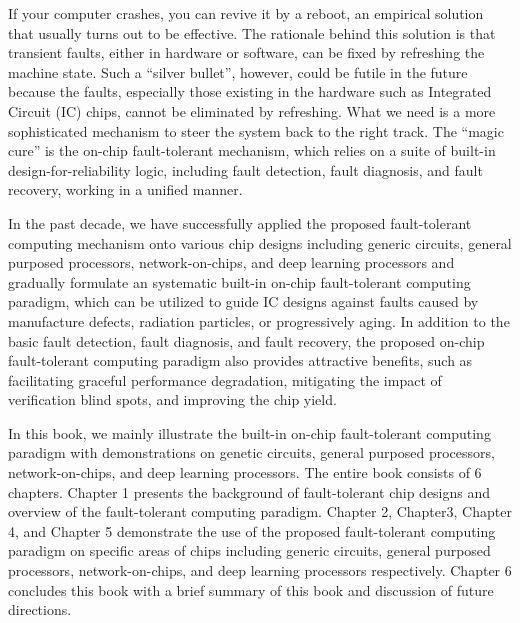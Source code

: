 %
%

\preface

If your computer crashes, you can revive it by a reboot, an empirical solution that usually turns out to be effective. The rationale behind this solution is that transient faults, either in hardware or software, can be fixed by refreshing the machine state. Such a “silver bullet”, however, could be futile in the future because the faults, especially those existing in the hardware such as Integrated Circuit (IC) chips, cannot be eliminated by refreshing. What we need is a more sophisticated mechanism to steer the system back to the right track. The “magic cure” is the on-chip fault-tolerant mechanism, which relies on a suite of built-in design-for-reliability logic, including fault detection, fault diagnosis, and fault recovery, working in a unified manner. 

In the past decade, we have successfully applied the proposed fault-tolerant computing mechanism onto various chip designs including generic circuits, general purposed processors, network-on-chips, and deep learning processors and gradually formulate an systematic built-in on-chip fault-tolerant computing paradigm, which can be utilized to guide IC designs against faults caused by manufacture defects, radiation particles, or progressively aging. In addition to the basic fault detection, fault diagnosis, and fault recovery, the proposed on-chip fault-tolerant computing paradigm also provides attractive benefits, such as facilitating graceful performance degradation, mitigating the impact of verification blind spots, and improving the chip yield.

In this book, we mainly illustrate the built-in on-chip fault-tolerant computing paradigm with demonstrations on genetic circuits, general purposed processors, network-on-chips, and deep learning processors. The entire book consists of 6 chapters. Chapter 1 presents the background of fault-tolerant chip designs and overview of the fault-tolerant computing paradigm. Chapter 2, Chapter3, Chapter 4, and Chapter 5 demonstrate the use of the proposed fault-tolerant computing paradigm on specific areas of chips including generic circuits, general purposed processors, network-on-chips, and deep learning processors respectively. Chapter 6 concludes this book with a brief summary of this book and discussion of future directions.


